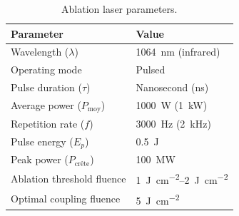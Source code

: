 \documentclass[11pt,a4paper]{article}
\begin{document}
\begin{enumerate}
    \begin{table}[H]
      \centering
      \small
      \caption{Ablation laser parameters.}
      \label{tab:laser_ablation}
      \begin{tabular}{p{6cm} p{6cm}}
        \toprule
        \textbf{Parameter} & \textbf{Value} \\
        \midrule
        Wavelength ($\lambda$) & \SI{1064}{\nano\metre} (infrared) \\
        Operating mode & Pulsed \\
        Pulse duration ($\tau$) & Nanosecond (ns) \\
        Average power ($P_{\text{moy}}$) & \SI{1000}{\watt} (\SI{1}{\kilo\watt}) \\
        Repetition rate ($f$) & \SI{3000}{\hertz} (\SI{2}{\kilo\hertz}) \\
        Pulse energy ($E_p$) & \SI{0.5}{\joule} \\
        Peak power ($P_{\text{crête}}$) & \SI{100}{\mega\watt} \\
        Ablation threshold fluence & \SIrange{1}{2}{\joule\per\centi\metre\squared} \\
        Optimal coupling fluence & \SI{5}{\joule\per\centi\metre\squared} \\
        \bottomrule
      \end{tabular}
    \end{table}
\end{enumerate}

\end{document}
